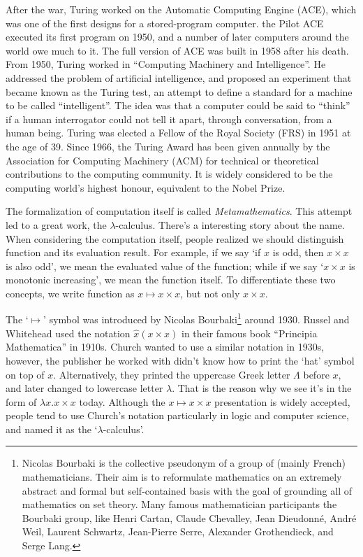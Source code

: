\documentclass{article}
\begin{document}
After the war, Turing worked on the Automatic Computing Engine (ACE), which was one of the first designs for a stored-program computer. the Pilot ACE  executed its first program on 1950, and a number of later computers around the world owe much to it. The full version of ACE was built in 1958 after his death. From 1950, Turing worked in ``Computing Machinery and Intelligence''. He addressed the problem of artificial intelligence, and proposed an experiment that became known as the Turing test, an attempt to define a standard for a machine to be called ``intelligent''. The idea was that a computer could be said to ``think'' if a human interrogator could not tell it apart, through conversation, from a human being. Turing was elected a Fellow of the Royal Society (FRS) in 1951 at the age of 39. Since 1966, the Turing Award has been given annually by the Association for Computing Machinery (ACM) for technical or theoretical contributions to the computing community. It is widely considered to be the computing world's highest honour, equivalent to the Nobel Prize.

The formalization of computation itself is called {\em Metamathematics}. This attempt led to a great work, the $\lambda$-calculus. There's a interesting story about the name. When considering the computation itself, people realized we should distinguish function and its evaluation result. For example, if we say `if $x$ is odd, then $x \times x$ is also odd', we mean the evaluated value of the function; while if we say `$x \times x$ is monotonic increasing', we mean the function itself. To differentiate these two concepts, we write function as $x \mapsto x \times x$, but not only $x \times x$.

The `$\mapsto$' symbol was introduced by Nicolas Bourbaki\footnote{Nicolas Bourbaki is the collective pseudonym of a group of (mainly French) mathematicians. Their aim is to reformulate mathematics on an extremely abstract and formal but self-contained basis with the goal of grounding all of mathematics on set theory. Many famous mathematician participants the Bourbaki group, like Henri Cartan, Claude Chevalley, Jean Dieudonné, André Weil, Laurent Schwartz, Jean-Pierre Serre, Alexander Grothendieck, and Serge Lang.} around 1930. Russel and Whitehead used the notation $\hat{x}(x \times x)$ in their famous book ``Principia Mathematica'' in 1910s. Church wanted to use a similar notation in 1930s, however, the publisher he worked with didn't know how to print the `hat' symbol on top of $x$. Alternatively, they printed the uppercase Greek letter $\Lambda$ before $x$, and later changed to lowercase letter $\lambda$. That is the reason why we see it's in the form of $\lambda x . x \times x$ today\cite{Dowek2011}. Although the $x \mapsto x \times x$ presentation is widely accepted, people tend to use Church's notation particularly in logic and computer science, and named it as the `$\lambda$-calculus'.
\end{document}
